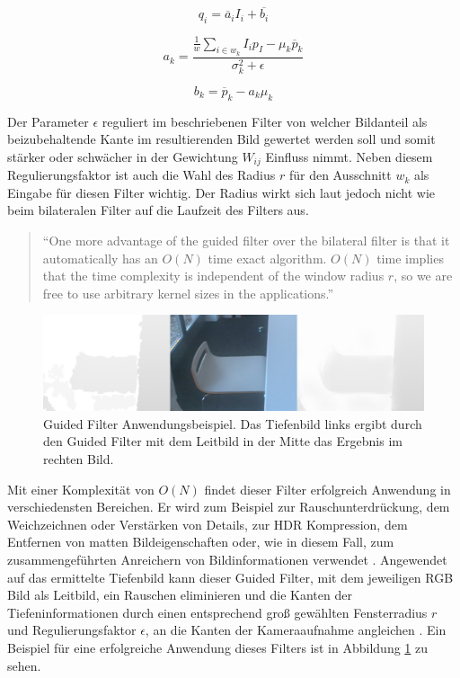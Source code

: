 \begin{equation} \label{eq:gf-final}
q_i = \overline{a}_iI_i+\overline{b_i}
\end{equation}

\begin{equation} \label{eq:gf-a}
a_k = \frac{\frac{1}{w} \sum_{i \in w_k} I_i p_I - \mu_k \overline{p}_k}{\sigma_k^2+\epsilon}
\end{equation}

\begin{equation} \label{eq:gf-b}
b_k = \overline{p}_k - a_k\mu_k
\end{equation}

Der Parameter \(\epsilon\) reguliert im beschriebenen Filter von \citet{he2010guided} welcher Bildanteil als beizubehaltende Kante im resultierenden Bild gewertet werden soll und somit stärker oder schwächer in der Gewichtung \(W_{ij}\) Einfluss nimmt. Neben diesem Regulierungsfaktor ist auch die Wahl des Radius \(r\) für den Ausschnitt \(w_k\) als Eingabe für diesen Filter wichtig. Der Radius wirkt sich laut \citet{he2010guided} jedoch nicht wie beim bilateralen Filter auf die Laufzeit des Filters aus. 

\begin{quote}
\enquote{One more advantage of the guided filter over the bilateral filter is that it automatically has an \(O(N)\) time exact algorithm. \(O(N)\) time implies that the time complexity is independent of the window radius \(r\), so we are free to use arbitrary kernel sizes in the applications.} \citep{he2010guided}
\end{quote}

\begin{figure}[h]
  \centering
	\includegraphics[width=1.0\textwidth]{content/images/methods/gf-result.png} 
  \caption{Guided Filter Anwendungsbeispiel. Das Tiefenbild links ergibt durch den Guided Filter mit dem Leitbild in der Mitte das Ergebnis im rechten Bild.}
  \label{fig:gf-result}
\end{figure}

Mit einer Komplexität von \(O(N)\) findet dieser Filter erfolgreich Anwendung in verschiedensten Bereichen. Er wird zum Beispiel zur Rauschunterdrückung, dem Weichzeichnen oder Verstärken von Details, zur HDR Kompression, dem Entfernen von matten Bildeigenschaften oder, wie in diesem Fall, zum zusammengeführten Anreichern von Bildinformationen verwendet \citep{he2010guided}. Angewendet auf das ermittelte Tiefenbild kann dieser Guided Filter, mit dem jeweiligen RGB Bild als Leitbild, ein Rauschen eliminieren und die Kanten der Tiefeninformationen durch einen entsprechend groß gewählten Fensterradius \(r\) und Regulierungsfaktor \(\epsilon\), an die Kanten der Kameraaufnahme angleichen \citep{liu2012guided}. Ein Beispiel für eine erfolgreiche Anwendung dieses Filters ist in Abbildung \ref{fig:gf-result} zu sehen.


